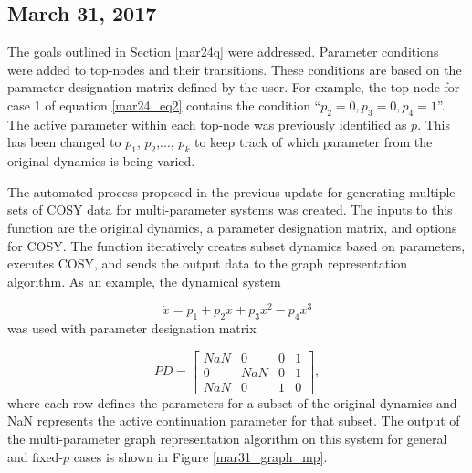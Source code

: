 \documentclass[12pt]{article}
\begin{document}
\subsection{March 31, 2017}
The goals outlined in Section \ref{mar24q} were addressed. Parameter conditions were added to top-nodes and their transitions. These conditions are based on the parameter designation matrix defined by the user. For example, the top-node for case 1 of equation \ref{mar24_eq2} contains the condition ``$p_2=0, p_3=0, p_4=1$''. The active parameter within each top-node was previously identified as $p$. This has been changed to $p_1$, $p_2$,..., $p_k$ to keep track of which parameter from the original dynamics is being varied.

The automated process proposed in the previous update for generating multiple sets of COSY data for multi-parameter systems was created. The inputs to this function are the original dynamics, a parameter designation matrix, and options for COSY. The function iteratively creates subset dynamics based on parameters, executes COSY, and sends the output data to the graph representation algorithm. As an example, the dynamical system

\begin{equation}
\label{mar31_eq1}
\dot{x}=p_1+p_2x+p_3x^2-p_4x^3
\end{equation}
was used with parameter designation matrix

\begin{equation}
PD=\begin{bmatrix}
    NaN & 0 & 0 & 1\\
    0 & NaN & 0 & 1\\
    NaN & 0 & 1 & 0 
\end{bmatrix},
\end{equation}
where each row defines the parameters for a subset of the original dynamics and NaN represents the active continuation parameter for that subset. The output of the multi-parameter graph representation algorithm on this system for general and fixed-$p$ cases is shown in Figure \ref{mar31_graph_mp}.
\end{document}
